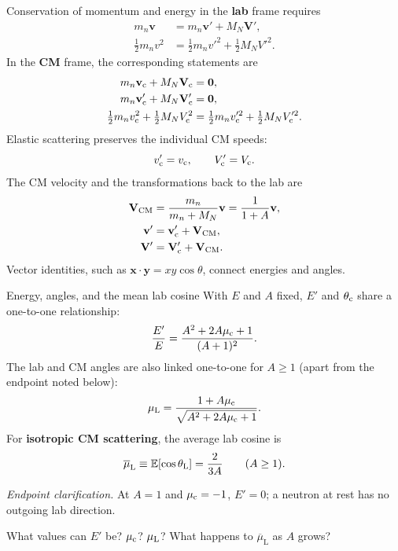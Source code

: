 \begin{handoutcolumns}
\switchcolumn
\RaggedRight
{}
\begingroup\footnotesize
Conservation of momentum and energy in the \textbf{lab} frame requires
\begin{align*}
  m_n\mathbf v &= m_n\mathbf v' + M_N\mathbf V',\\
  \tfrac12m_n v^2 &= \tfrac12m_n v'^2+\tfrac12 M_N V'^2.
\end{align*}
In the \textbf{CM} frame, the corresponding statements are
\begin{align*}
  m_n\mathbf{v}_{\mathrm c}+M_N\mathbf{V}_{\mathrm c} &= \mathbf0,\\
  m_n\mathbf{v}_{\mathrm c}'+M_N\mathbf{V}_{\mathrm c}' &= \mathbf0,\\
  \tfrac12m_nv_{\mathrm c}^2+\tfrac12M_NV_{\mathrm c}^2
    &=\tfrac12m_nv_{\mathrm c}'^2+\tfrac12M_NV_{\mathrm c}'^2.
\end{align*}
Elastic scattering preserves the individual CM speeds:
\[
v_{\mathrm c}'=v_{\mathrm c},\qquad V_{\mathrm c}'=V_{\mathrm c}.
\]
The CM velocity and the transformations back to the lab are
\begin{align*}
  \mathbf{V}_{\mathrm{CM}} &=\frac{m_n}{m_n+M_N}\mathbf v
         =\frac{1}{1+A}\mathbf v,\\
  \mathbf v'&=\mathbf{v}_{\mathrm c}'+\mathbf{V}_{\mathrm{CM}},\\
  \mathbf V'&=\mathbf{V}_{\mathrm c}'+\mathbf{V}_{\mathrm{CM}}.
\end{align*}
Vector identities, such as
$\mathbf x\!\cdot\!\mathbf y=xy\cos\theta$, connect energies and angles.
\endgroup

\begin{fixedbox}{Energy, angles, and the mean lab cosine}
With $E$ and $A$ fixed, $E'$ and $\theta_{\mathrm c}$ share a one-to-one relationship:
\[
\frac{E'}{E}=\frac{A^2+2A\mu_{\mathrm c}+1}{(A+1)^2}.
\]
\medskip
The lab and CM angles are also linked one-to-one for $A\geq1$
(apart from the endpoint noted below):
\[
\mu_{\mathrm L}=\frac{1+A\mu_{\mathrm c}}{\sqrt{A^2+2A\mu_{\mathrm c}+1}}.
\]
\medskip
For \textbf{isotropic CM scattering}, the average lab cosine is
\[
\overline{\mu}_{\mathrm L}\equiv\mathbb{E}[\cos\theta_{\mathrm L}]
  =\frac{2}{3A}\qquad(A\geq1).
\]
\end{fixedbox}

{\footnotesize\textit{Endpoint clarification.}
At $A=1$ and $\mu_{\mathrm c}=-1$, $E'=0$; a neutron at rest has no outgoing lab direction.\par}

\begin{checkpoint}[Ponderables]
What values can $E'$ be? $\mu_{\mathrm c}$? $\mu_{\mathrm L}$?
What happens to $\overline{\mu}_{\mathrm L}$ as $A$ grows?
\end{checkpoint}
\end{handoutcolumns}


